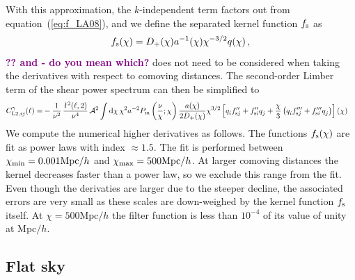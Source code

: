 \documentclass[fleqn,usenatbib]{mnras} %
\newcommand{\ellbar}{\hbox{\it \l}\,}
\newcommand{\pref}{{\cal A}}
\newcommand{\ch}[1]{\textcolor{purple}{\bf #1}}
\begin{document}
With this approximation, the $k$-independent term factors out from equation~(\ref{eq:f_LA08}), and we define the separated kernel function $f_{\rm s}$ as
%
\begin{equation}
  f_{\rm s}(\chi) = D_+(\chi) a^{-1}(\chi) \chi^{-3/2} q(\chi) \, ,
  \label{eq:f_LA08_s}
\end{equation}
%
\ch{?? and - do you mean which?} does not need to be considered when taking the derivatives with respect to comoving distances.
The second-order Limber term of the shear power spectrum can then be simplified to
%
\begin{align}
  C^\gamma_{{\rm L2}, ij}(\ell) = & - \frac 1 {\nu^2} \, \frac{\ellbar^2(\ell, 2)}{\nu^4} \, \pref^2
    \int {\rm d} \chi \, \chi^{2} a^{-2} P_{\rm m}\left(\frac\nu\chi; \chi\right)
    \frac {a(\chi)}{2 D_+(\chi)} \chi^{3/2}
    \left[ q^{}_i f^{\prime\prime}_{{\rm s} j} + f^{\prime\prime}_{{\rm s}i} q^{}_j
      + \frac{\chi}{3} \left( q^{}_i f^{\prime\prime\prime}_{{\rm s}j} + f^{\prime\prime\prime}_{{\rm s}i} q^{}_j
      \right)
    \right](\chi)
  \label{eq:C_ell_limber2_dr_s}
\end{align}
%
We compute the numerical higher derivatives as follows. The functions $f_{\rm
s}(\chi)$ are fit as power laws with index $\approx 1.5$. The fit is
performed between $\chi_{\rm min} = 0.001 {\rm Mpc}/h$ and $\chi_{\rm max} =
500 \mbox{Mpc}/h$. At larger comoving distances the kernel decreases faster
than a power law, so we exclude this range from the fit. Even though the
derivaties are larger due to the steeper decline, the associated errors are
very small as these scales are down-weighed by the kernel function $f_{\rm
s}$ itself. At $\chi = 500 \mbox{Mpc}/h$ the filter function is less than
$10^{-4}$ of its value of unity at Mpc$/h$.


\subsection{Flat sky}
\label{sec:Limber_flat_sky}
\end{document}
